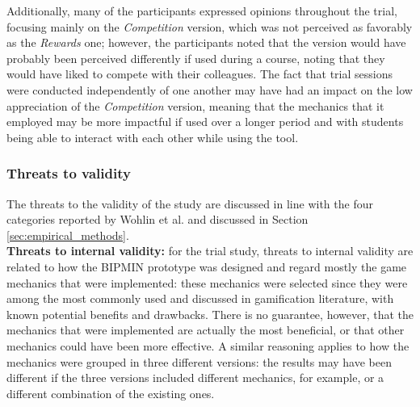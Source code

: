 Additionally, many of the participants expressed opinions throughout the trial, focusing mainly on the \textit{Competition} version, which was not perceived as favorably as the \textit{Rewards} one; however, the participants noted that the version would have probably been perceived differently if used during a course, noting that they would have liked to compete with their colleagues. The fact that trial sessions were conducted independently of one another may have had an impact on the low appreciation of the \textit{Competition} version, meaning that the mechanics that it employed may be more impactful if used over a longer period and with students being able to interact with each other while using the tool.




\subsubsection{Threats to validity}
\label{sec:threats}

The threats to the validity of the study are discussed in line with the four categories reported by Wohlin et al.\cite{wohlin2012experimentation} and discussed in Section \ref{sec:empirical_methods}.\\

\textbf{Threats to internal validity:} for the trial study, threats to internal validity are related to how the BIPMIN prototype was designed and regard mostly the game mechanics that were implemented: these mechanics were selected since they were among the most commonly used and discussed in gamification literature, with known potential benefits and drawbacks. There is no guarantee, however, that the mechanics that were implemented are actually the most beneficial, or that other mechanics could have been more effective. 
A similar reasoning applies to how the mechanics were grouped in three different versions: the results may have been different if the three versions included different mechanics, for example, or a different combination of the existing ones.

